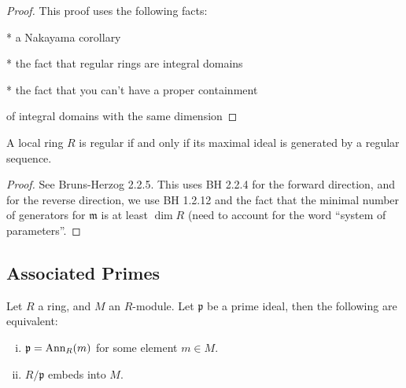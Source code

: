 \begin{proof}


  This proof uses the following facts:



  * a Nakayama corollary

  

  * the fact that regular rings are integral domains



  * the fact that you can't have a proper containment

    of integral domains with the same dimension

\end{proof}



\begin{proposition}
  \label{prop:reg_loc_maximal_reg_seq}
  A local ring $R$ is regular if and only if
  its maximal ideal is generated by a regular sequence.
\end{proposition}



\begin{proof}
  See Bruns-Herzog 2.2.5. This uses BH 2.2.4 for the forward
  direction,
  and for the reverse direction, we use BH 1.2.12 and the fact that
  the minimal number of generators for $\mathfrak{m}$ is at least
  $\dim R$ (need to account for the word ``system of parameters''.
\end{proof}

\subsection{Associated Primes}

\begin{proposition}
  \label{prop:assoc_primes_def_equiv}
  Let $R$ a ring, and $M$ an $R$-module.
  Let $\mathfrak{p}$ be a prime ideal, 
  then 
  the following are equivalent:
  \begin{enumerate}[(i)]
    \item $\mathfrak{p} = \text{Ann}_R (m)$ for some element 
      $m \in M$.
    \item $R / \mathfrak{p}$ embeds into $M$.
  \end{enumerate}
\end{proposition}

